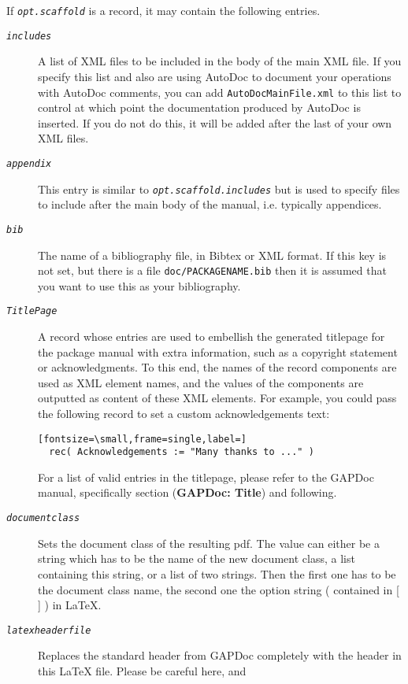 \documentclass[a4paper,11pt]{report}
\begin{document}
{{{\begin{description}
\begin{description}
 If \mbox{\texttt{\mdseries\slshape opt.scaffold}} is a record, it may contain the following entries. 
\begin{description}
\item[{\mbox{\texttt{\mdseries\slshape includes}}}]  A list of XML files to be included in the body of the main XML file. If you
specify this list and also are using \textsf{AutoDoc} to document your operations with \textsf{AutoDoc} comments, you can add \texttt{AutoDocMainFile.xml} to this list to control at which point the documentation produced by \textsf{AutoDoc} is inserted. If you do not do this, it will be added after the last of your
own XML files. 
\item[{\mbox{\texttt{\mdseries\slshape appendix}}}]  This entry is similar to \mbox{\texttt{\mdseries\slshape opt.scaffold.includes}} but is used to specify files to include after the main body of the manual,
i.e. typically appendices. 
\item[{\mbox{\texttt{\mdseries\slshape bib}}}]  The name of a bibliography file, in Bibtex or XML format. If this key is not
set, but there is a file \texttt{doc/PACKAGENAME.bib} then it is assumed that you want to use this as your bibliography. 
\item[{\mbox{\texttt{\mdseries\slshape TitlePage}}}]  A record whose entries are used to embellish the generated titlepage for the
package manual with extra information, such as a copyright statement or
acknowledgments. To this end, the names of the record components are used as
XML element names, and the values of the components are outputted as content
of these XML elements. For example, you could pass the following record to set
a custom acknowledgements text: 
\begin{Verbatim}[fontsize=\small,frame=single,label=]
  rec( Acknowledgements := "Many thanks to ..." )
\end{Verbatim}
 For a list of valid entries in the titlepage, please refer to the \textsf{GAPDoc} manual, specifically section  (\textbf{GAPDoc: Title}) and following. 
\item[{\mbox{\texttt{\mdseries\slshape document{\textunderscore}class}}}]  Sets the document class of the resulting pdf. The value can either be a string
which has to be the name of the new document class, a list containing this
string, or a list of two strings. Then the first one has to be the document
class name, the second one the option string ( contained in [ ] ) in LaTeX. 
\item[{\mbox{\texttt{\mdseries\slshape latex{\textunderscore}header{\textunderscore}file}}}]  Replaces the standard header from \textsf{GAPDoc} completely with the header in this LaTeX file. Please be careful here, and

\end{description}
\end{description}
\end{description}}}}
\end{document}
